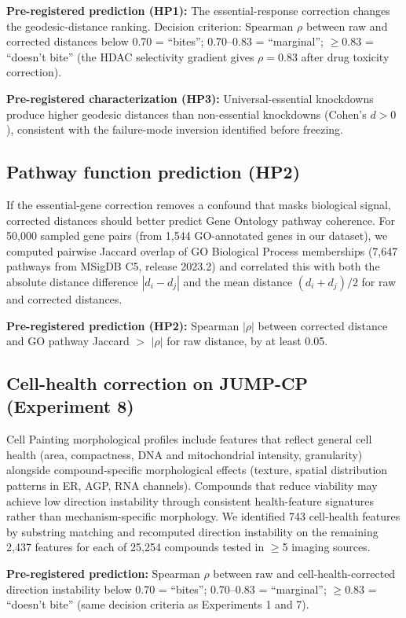 \documentclass{article}
\begin{document}
\textbf{Pre-registered prediction (HP1):} The essential-response correction
changes the geodesic-distance ranking. Decision criterion: Spearman $\rho$
between raw and corrected distances below 0.70 = ``bites''; 0.70--0.83 =
``marginal''; $\geq 0.83$ = ``doesn't bite'' (the HDAC selectivity
gradient gives $\rho = 0.83$ after drug toxicity correction).

\textbf{Pre-registered characterization (HP3):} Universal-essential
knockdowns produce higher geodesic distances than non-essential knockdowns
(Cohen's $d > 0$), consistent with the failure-mode inversion identified
before freezing.

\subsection{Pathway function prediction (HP2)}

If the essential-gene correction removes a confound that masks biological
signal, corrected distances should better predict Gene Ontology pathway
coherence. For 50{,}000 sampled gene pairs (from 1{,}544 GO-annotated genes
in our dataset), we computed pairwise Jaccard overlap of GO Biological
Process memberships (7{,}647 pathways from MSigDB C5, release 2023.2) and
correlated this with both the absolute distance difference $|d_i - d_j|$
and the mean distance $(d_i + d_j)/2$ for raw and corrected distances.

\textbf{Pre-registered prediction (HP2):} Spearman $|\rho|$ between corrected
distance and GO pathway Jaccard $>$ $|\rho|$ for raw distance, by at least
0.05.

\subsection{Cell-health correction on JUMP-CP (Experiment 8)}

Cell Painting morphological profiles include features that reflect general
cell health (area, compactness, DNA and mitochondrial intensity, granularity)
alongside compound-specific morphological effects (texture, spatial
distribution patterns in ER, AGP, RNA channels). Compounds that reduce
viability may achieve low direction instability through consistent
health-feature signatures rather than mechanism-specific morphology. We
identified 743 cell-health features by substring matching and recomputed
direction instability on the remaining 2{,}437 features for each of 25{,}254
compounds tested in $\geq$5 imaging sources.

\textbf{Pre-registered prediction:} Spearman $\rho$ between raw and
cell-health-corrected direction instability below 0.70 = ``bites'';
0.70--0.83 = ``marginal''; $\geq 0.83$ = ``doesn't bite'' (same decision
criteria as Experiments 1 and 7).
\end{document}
